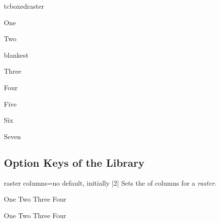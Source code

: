 \begin{docEnvironment}[doc new=2016-02-19]{tcboxedraster}{}
\begin{dispExample}
\begin{tcbraster}[raster columns=2, raster equal height,
  raster every box/.style={size=small,colframe=red!50!black,colback=red!10!white,
    valign=center,halign=center}]
  \begin{tcolorbox}One\end{tcolorbox}
  \begin{tcolorbox}Two\end{tcolorbox}
    \begin{tcboxedraster}{blankest}
      \begin{tcolorbox}Three\end{tcolorbox}
      \begin{tcolorbox}Four\end{tcolorbox}
      \begin{tcolorbox}Five\end{tcolorbox}
      \begin{tcolorbox}Six\end{tcolorbox}
    \end{tcboxedraster}
    \begin{tcolorbox}Seven\end{tcolorbox}
\end{tcbraster}
\end{dispExample}


\end{docEnvironment}


\clearpage
\subsection{Option Keys of the Library}\label{subsec:raster_options}

\begin{docTcbKey}[][doc new=2014-11-10]{raster columns}{=}{no default, initially |2|}
  Sets the  of columns for a \emph{raster}.
\begin{dispExample}
\begin{tcbitemize}[raster columns=3,
  size=small,colframe=red!50!black,colback=red!10!white]
  \tcbitem One
  \tcbitem Two
  \tcbitem Three
  \tcbitem Four
\end{tcbitemize}
\begin{tcbitemize}[raster columns=4,
  size=small,colframe=blue!50!black,colback=blue!10!white]
  \tcbitem One
  \tcbitem Two
  \tcbitem Three
  \tcbitem Four
\end{tcbitemize}
\end{dispExample}
\end{docTcbKey}

